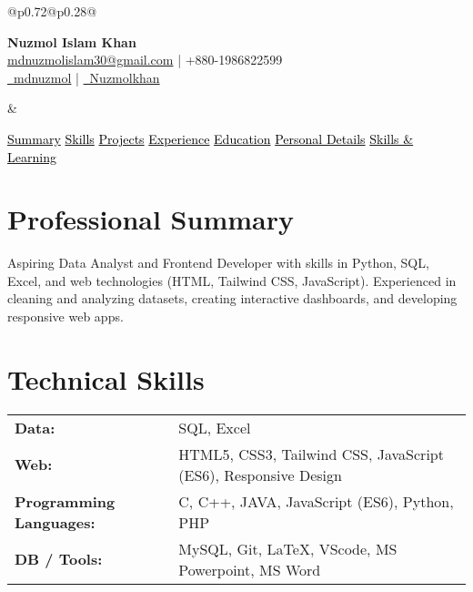 \documentclass[a4paper,10pt]{article}
\newcommand{\buttonlink}[2]{%
  \colorbox{gray!20}{\hyperref[#1]{\textcolor{black}{#2}}}%
}
\newcommand{\cvsection}[2]{%
  \section*{\textcolor{blue!50!black}{#1}}\label{#2}%
  \vspace{4pt}%
}
\begin{document}
\begin{tabular}{@{}p{0.72\textwidth}@{}p{0.28\textwidth}@{}}
\begin{minipage}[c]{\linewidth}
    {\LARGE \textbf{Nuzmol Islam Khan}} \\[4pt]
    \href{mailto:mdnuzmolislam30@gmail.com}{mdnuzmolislam30@gmail.com} \; | \; +880-1986822599 \\
    \href{https://www.linkedin.com/in/mdnuzmol}{\faLinkedin\ mdnuzmol} \; | \;
    \href{https://github.com/Nuzmolkhan}{\faGithub\ Nuzmolkhan}
\end{minipage} &
\begin{minipage}[c]{\linewidth}
    \raggedleft
\end{minipage}
\end{tabular}

\vspace{8pt}

\noindent
\buttonlink{sec:summary}{Summary} \hspace{3pt}
\buttonlink{sec:skills}{Skills} \hspace{3pt}
\buttonlink{sec:projects}{Projects} \hspace{3pt}
\buttonlink{sec:experience}{Experience} \hspace{3pt}
\buttonlink{sec:education}{Education} \hspace{3pt}
\buttonlink{sec:personal}{Personal Details} \hspace{3pt}
\buttonlink{sec:learning}{Skills \& Learning}

\vspace{8pt}

\cvsection{Professional Summary}{sec:summary}
Aspiring Data Analyst and Frontend Developer with skills in Python, SQL, Excel, and web technologies (HTML, Tailwind CSS, JavaScript). Experienced in cleaning and analyzing datasets, creating interactive dashboards, and developing responsive web apps.

\cvsection{Technical Skills}{sec:skills}
\begin{tabular}{p{3.3cm} p{12cm}}
\textbf{Data:} & SQL, Excel \\
\textbf{Web:} & HTML5, CSS3, Tailwind CSS, JavaScript (ES6), Responsive Design \\
\textbf{Programming Languages:} & C, C++, JAVA, JavaScript (ES6), Python, PHP \\
\textbf{DB / Tools:} & MySQL, Git, LaTeX, VScode, MS Powerpoint, MS Word \\
\end{tabular}
\end{document}
